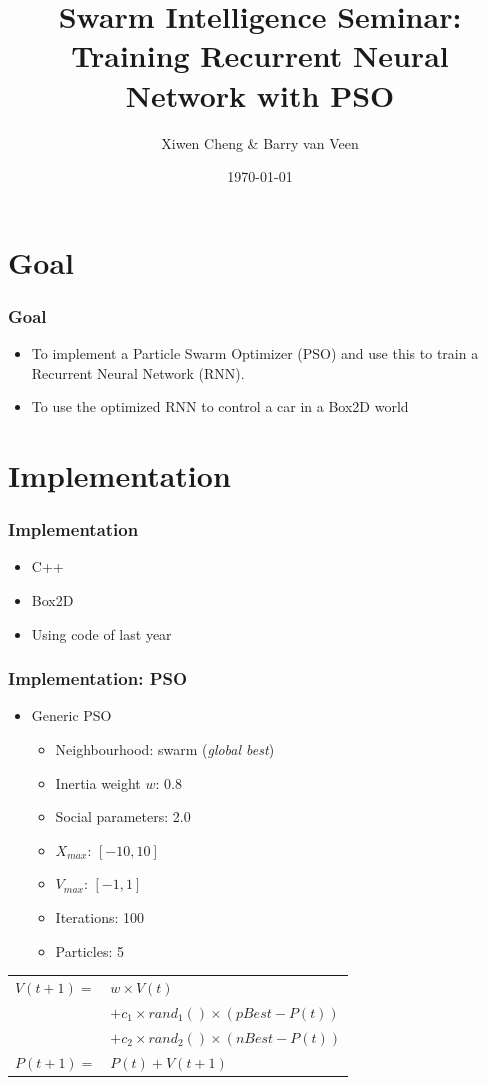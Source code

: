 \documentclass{beamer}
\title{Swarm Intelligence Seminar:\\Training Recurrent Neural Network with PSO}
\author{Xiwen Cheng \& Barry van Veen}
\institute{LIACS}
\date{\today}
\begin{document}
\begin{frame}
\titlepage
\end{frame}

\begin{frame}
\tableofcontents
\end{frame}

\section{Goal}
\begin{frame}[fragile]
  \frametitle{Goal}
  \begin{itemize}
    \item To implement a Particle Swarm Optimizer (PSO) and use this to train a Recurrent Neural Network (RNN).
    \item To use the optimized RNN to control a car in a Box2D world
  \end{itemize}  
\end{frame}

\section{Implementation}
\begin{frame}[fragile]
  \frametitle{Implementation}
  \begin{itemize}
    \item C++
    \item Box2D
    \item Using code of last year
  \end{itemize}  
\end{frame}

\begin{frame}[fragile]
  \frametitle{Implementation: PSO}
  \begin{itemize}
    \item Generic PSO
      \begin{itemize}
	\item Neighbourhood: swarm (\textit{global best})
	\item Inertia weight $w$: 0.8
	\item Social parameters: 2.0
	\item $X_{max}$: $[-10, 10]$
	\item $V_{max}$: $[-1, 1]$
	\item Iterations: 100
	\item Particles: 5
      \end{itemize}
  \end{itemize}

  \bigskip
  \begin{tabular}{ll}
    $V(t+1) =$ 	& $w \times V(t)$ \\
		& $+ c_{1} \times rand_{1}() \times (pBest - P(t))$ \\
		& $+ c_{2} \times rand_{2}()\times (nBest - P(t))$ \\
    $P(t+1) =$	& $P(t) + V(t+1)$ \\
  \end{tabular}
\end{frame}
\end{document}
